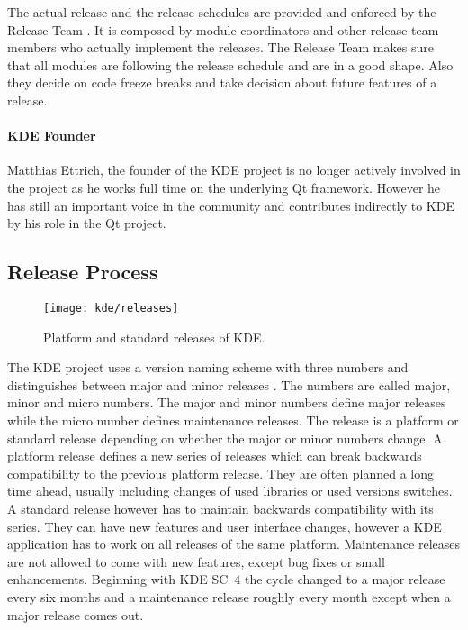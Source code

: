 The actual release and the release schedules are provided and enforced by the
Release Team \cite{KDEReleaseTeam}. It is composed by module coordinators and
other release team members who actually implement the releases. The Release
Team makes sure that all modules are following the release schedule and are in
a good shape. Also they decide on code freeze breaks and take decision about
future features of a release.

\paragraph{KDE Founder}

Matthias Ettrich, the founder of the KDE project is no longer actively involved
in the project as he works full time on the underlying Qt framework. However he
has still an important voice in the community and contributes indirectly to KDE
by his role in the Qt project.


\subsection{Release Process} %

\begin{figure}[htbp]
  \centering
  \texttt{[image: kde/releases]}
  \caption[Major releases of KDE]{Platform and standard releases of KDE.}
\end{figure}

The KDE project uses a version naming scheme with three numbers and
distinguishes between major and minor releases
\cite{KDEReleaseTeam,KDEReleaseSchedule,KDESchedule}. The numbers are called
major, minor and micro numbers. The major and minor numbers define major
releases while the micro number defines maintenance releases. The release is a
platform or standard release depending on whether the major or minor numbers
change. A platform release defines a new series of releases which can break
backwards compatibility to the previous platform release. They are often
planned a long time ahead, usually including changes of used libraries or used
versions switches. A standard release however has to maintain backwards
compatibility with its series. They can have new features and user interface
changes, however a KDE application has to work on all releases of the same
platform. Maintenance releases are not allowed to come with new features,
except bug fixes or small enhancements. Beginning with \ac{KDE SC}~4 the cycle
changed to a major release every six months and a maintenance release roughly
every month except when a major release comes out.

